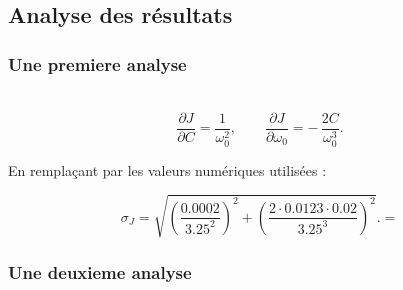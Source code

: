\subsection{Analyse des résultats}

\subsubsection{Une premiere analyse}


\\


\[
\frac{\partial J}{\partial C} = \frac{1}{\omega_0^2},
\qquad
\frac{\partial J}{\partial \omega_0}
= -\,\frac{2C}{\omega_0^3}.
\]

En remplaçant par les valeurs numériques utilisées :

\[
\sigma_J = 
\sqrt{
\left( \frac{0.0002}{3.25^2} \right)^2
+
\left( \frac{2 \cdot 0.0123 \cdot 0.02}{3.25^3} \right)^2
}.
 = \]


\subsubsection{Une deuxieme analyse}

